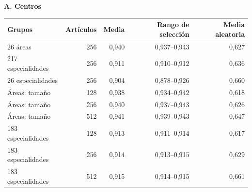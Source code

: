 \par\noindent\begin{minipage}{\linewidth}
\small
\setlength{\tabcolsep}{3pt}
\renewcommand{\arraystretch}{1.15}
\label{tab:S18}
\textbf{A. Centros}\par\smallskip
\begin{tabular*}{\linewidth}{@{\extracolsep{\fill}}lrrrr@{}}
\toprule
\textbf{Grupos} & \textbf{Artículos} & \textbf{Media} & \textbf{Rango de selección} & \textbf{Media aleatoria} \\
\midrule
26 áreas & 256 & 0,940 & 0,937--0,943 & 0,627 \\[2pt]
217 especialidades & 256 & 0,911 & 0,910--0,912 & 0,636 \\[2pt]
26 especialidades & 256 & 0,904 & 0,878--0,926 & 0,660 \\[2pt]
Áreas: tamaño & 128 & 0,938 & 0,934--0,942 & 0,618 \\[2pt]
Áreas: tamaño & 256 & 0,940 & 0,937--0,943 & 0,626 \\[2pt]
Áreas: tamaño & 512 & 0,941 & 0,939--0,943 & 0,647 \\[2pt]
183 especialidades & 128 & 0,913 & 0,911--0,914 & 0,617 \\[2pt]
183 especialidades & 256 & 0,914 & 0,913--0,915 & 0,629 \\[2pt]
183 especialidades & 512 & 0,915 & 0,914--0,915 & 0,661 \\[2pt]
\bottomrule
\end{tabular*}


\end{minipage}
